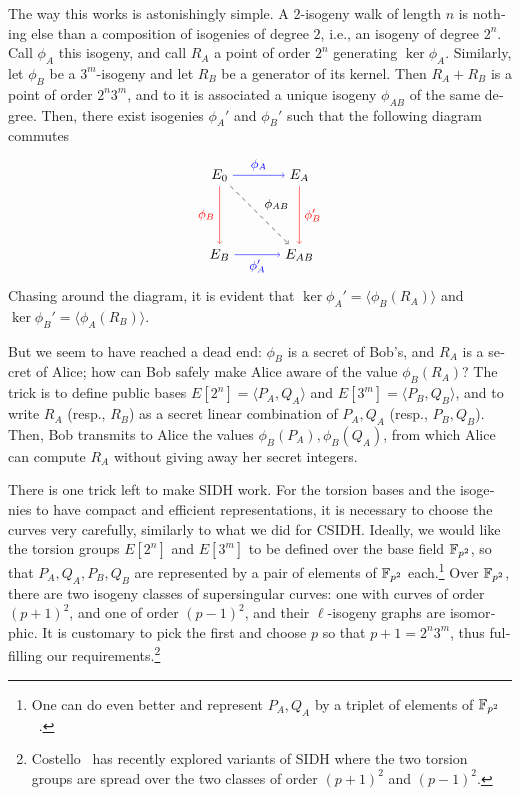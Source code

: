 \begin{otherlanguage}{english}
The way this works is astonishingly simple. A $2$-isogeny walk of
length $n$ is nothing else than a composition of isogenies of degree
$2$, i.e., an isogeny of degree $2^n$. Call $\phi_A$ this isogeny, and
call $R_A$ a point of order $2^n$ generating $\ker\phi_A$. Similarly,
let $\phi_B$ be a $3^m$-isogeny and let $R_B$ be a generator of its
kernel. Then $R_A+R_B$ is a point of order $2^n3^m$, and to it is
associated a unique isogeny $\phi_{AB}$ of the same degree. Then,
there exist isogenies $\phi_A'$ and $\phi_B'$ such that the following
diagram commutes
\begin{equation}
  \label{eq:sidh}
  \begin{tikzpicture}[scale=2,baseline=-1cm]
    \node (E0)  at (0,0) {\(E_0\)};
    \node (EA)  at (1,0) {\(E_A\)};
    \node (EB)  at (0,-1) {\(E_B\)};
    \node (EAB) at (1,-1) {\(E_{AB}\)};
    \draw[->,font=\small]
    (E0) edge[blue] node[auto] {\(\phi_A\)} (EA)
         edge[red] node[auto,swap] {\(\phi_B\)}  (EB)
         edge[dashed] node[auto] {\(\phi_{AB}\)}  (EAB)
    (EA) edge[red] node[auto] {\(\phi_B'\)}  (EAB)
    (EB) edge[blue] node[auto,swap] {\(\phi_A'\)}  (EAB);
  \end{tikzpicture}
\end{equation}
Chasing around the diagram, it is evident that
$\ker\phi_A' = \langle\phi_B(R_A)\rangle$ and
$\ker\phi_B' = \langle\phi_A(R_B)\rangle$.

But we seem to have reached a dead end: $\phi_B$ is a secret of Bob's,
and $R_A$ is a secret of Alice; how can Bob safely make Alice aware of
the value $\phi_B(R_A)$? The trick is to define public bases
$E[2^n]=\langle P_A,Q_A\rangle$ and $E[3^m]=\langle P_B,Q_B\rangle$,
and to write $R_A$ (resp., $R_B$) as a secret linear combination of
$P_A,Q_A$ (resp., $P_B,Q_B$). Then, Bob transmits to Alice the values
$\phi_B(P_A),\phi_B(Q_A)$, from which Alice can compute $R_A$ without
giving away her secret integers.

There is one trick left to make SIDH work. For the torsion bases and
the isogenies to have compact and efficient representations, it is
necessary to choose the curves very carefully, similarly to what we
did for CSIDH.  Ideally, we would like the torsion groups $E[2^n]$ and
$E[3^m]$ to be defined over the base field $\mathbb{F}_{p^2}$, so that
$P_A,Q_A,P_B,Q_B$ are represented by a pair of elements of $\mathbb{F}_{p^2}$
each.\footnote{One can do even better and represent $P_A,Q_A$ by a
  triplet of elements of $\mathbb{F}_{p^2}$~\cite{C:CosLonNae16}.} Over
$\mathbb{F}_{p^2}$, there are two isogeny classes of supersingular curves: one
with curves of order $(p+1)^2$, and one of order $(p-1)^2$, and their
$\ell$-isogeny graphs are isomorphic. It is customary to pick the
first and choose $p$ so that $p+1=2^n3^m$, thus fulfilling our
requirements.\footnote{Costello~\cite{cryptoeprint:2019:1145} has
  recently explored variants of SIDH where the two torsion groups are
  spread over the two classes of order $(p+1)^2$ and $(p-1)^2$.}


\end{otherlanguage}
